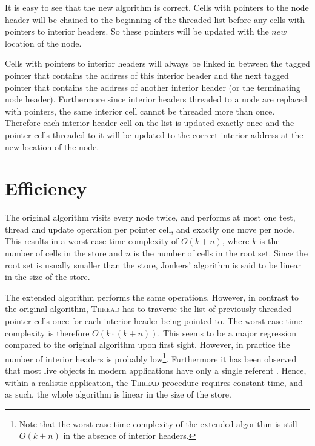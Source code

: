 \documentclass[10pt,a4paper,final,twocolumn]{article}
\begin{document}
It is easy to see that the new algorithm is correct. Cells with pointers to the node header will
be chained to the beginning of the threaded list before any cells with pointers to interior headers.
So these pointers will be updated with the $new$ location of the node.

Cells with pointers to interior headers will always be linked in between the tagged pointer that
contains the address of this interior header and the next tagged pointer that contains the address
of another interior header (or the terminating node header). Furthermore since interior headers
threaded to a node are replaced with pointers, the same interior cell cannot be threaded more than
once. Therefore each interior header cell on the list is updated exactly once and the pointer cells
threaded to it will be updated to the correct interior address at the new location of the node.


\section{Efficiency}
\label{sec:efficiency}


The original algorithm visits every node twice, and performs at most one test, thread and update
operation per pointer cell, and exactly one move per node. This results in a worst-case time
complexity of $O(k + n)$, where $k$ is the number of cells in the store and $n$ is the number
of cells in the root set. Since the root set is usually smaller than the store, Jonkers' algorithm
is said to be linear in the size of the store.

The extended algorithm performs the same operations. However, in contrast to the original algorithm,
\textsc{Thread} has to traverse the list of previously threaded pointer cells once for each interior
header being pointed to. The worst-case time complexity is therefore $O(k \cdot (k + n))$. This seems to
be a major regression compared to the original algorithm upon first sight. However, in practice
the number of interior headers is probably low\footnote{Note that the worst-case time complexity
of the extended algorithm is still $O(k + n)$ in the absence of interior headers.}. Furthermore it
has been observed that most live objects in modern applications have only a single referent
\cite{BlackburnGHKMBDFFGHHJLMPSVDW06,DeutschBobrow76,DieckmannH99,WegielKrintz09}. Hence, within a
realistic application, the \textsc{Thread} procedure requires constant time, and as such, the whole
algorithm is linear in the size of the store.
\end{document}
